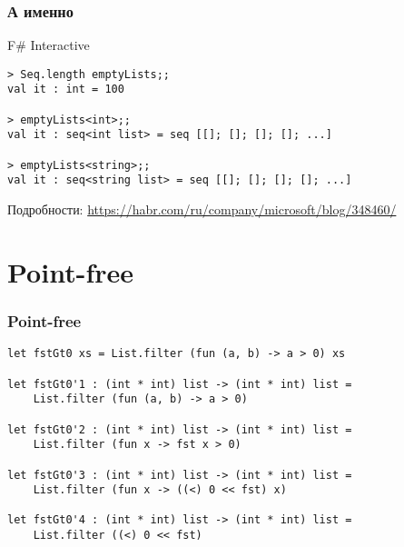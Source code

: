 \documentclass{../../slides-style}
\begin{document}
    \begin{frame}[fragile]
        \frametitle{А именно}
        \begin{alertblock}{F\# Interactive}
            \begin{verbatim}
> Seq.length emptyLists;;
val it : int = 100

> emptyLists<int>;;
val it : seq<int list> = seq [[]; []; []; []; ...]

> emptyLists<string>;;
val it : seq<string list> = seq [[]; []; []; []; ...]
            \end{verbatim}
        \end{alertblock}
        Подробности: \url{https://habr.com/ru/company/microsoft/blog/348460/}
    \end{frame}

    \section{Point-free}
    
    \begin{frame}[fragile]
        \frametitle{Point-free}
        \begin{verbatim}
let fstGt0 xs = List.filter (fun (a, b) -> a > 0) xs

let fstGt0'1 : (int * int) list -> (int * int) list = 
    List.filter (fun (a, b) -> a > 0)

let fstGt0'2 : (int * int) list -> (int * int) list = 
    List.filter (fun x -> fst x > 0)

let fstGt0'3 : (int * int) list -> (int * int) list = 
    List.filter (fun x -> ((<) 0 << fst) x)

let fstGt0'4 : (int * int) list -> (int * int) list = 
    List.filter ((<) 0 << fst)
        \end{verbatim}
    \end{frame}
\end{document}
